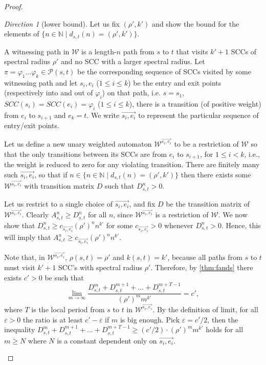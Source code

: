 \documentclass{lmcs}
\theoremstyle{plain}
\theoremstyle{definition}
\theoremstyle{remark}
\newtheorem{dir}{Direction}
\newcommand\period{T}
\newcommand{\SCC}{\ensuremath{\mathit{SCC}}}
\newcommand{\scc}{\varphi}
\newcommand\wa{\mathcal{W}}
\begin{document}
\begin{proof}
\hfill

\begin{dir}[{lower bound}]
Let us fix $(\rho',k')$ and show the bound for the elements of $\{n\in\mathbb{N} \mid d_{s,t}(n)= (\rho',k')\}$.

A witnessing path in $\wa$ is a length-$n$ path from $s$ to $t$ that visits $k'+1$ SCCs of spectral radius $\rho'$ and no SCC with a  larger spectral radius.
Let $\pi = \scc_1\dots\scc_k \in \mathscr{P}(s,t)$  be the corresponding sequence of SCCs visited by some witnessing path and let $s_i, e_i$ ($1\le i\le k$) be the entry and exit points (respectively into and out of $\scc_i$) on that path,
i.e.  $s=s_1$, $\SCC(s_i) = \SCC(e_i) = \scc_i$ ($1 \le i \le k$), there is a transition (of positive weight) from $e_i$ to $s_{i+1}$ and $e_k=t$. We write $\vec{s_i,e_i}$ to represent the particular sequence of entry/exit points.

Let us define  a new unary weighted automaton  $\wa^{\vec{s_i,e_i}}$ to be a restriction of $\wa$ so that
the only transitions between its SCCs are from $e_i$ to $s_{i+1}$, for $1 \le i < k$,
i.e., the weight is reduced to zero for any violating transition.  There are finitely many such $\vec{s_i,e_i}$, so that if $n \in \{n\in\mathbb{N} \mid d_{s,t}(n)= (\rho',k')\}$ then there exists some $\wa^{\vec{s_i,e_i}}$ with transition matrix $D$ such that $D_{s,t}^n > 0$.

Let us restrict to a single choice of $\vec{s_i,e_i}$, and fix $D$ be the transition matrix of $\wa^{\vec{s_i,e_i}}$. Clearly $A_{s,t}^n \ge D_{s,t}^n$ for all $n$, since $\wa^{\vec{s_i,e_i}}$ is a restriction of $\wa$. We now show that $D_{s,t}^n \ge c_{\vec{s_i,e_i}}(\rho')^n n^{k'}$ for some $c_{\vec{s_i,e_i}} > 0$ whenever $D_{s,t}^{n}>0$. Hence, this will imply that $A_{s,t}^n\ge c_{\vec{s_i,e_i}}(\rho')^n n^{k'}$.

Note that, in $\wa^{\vec{s_i,e_i}}$, $\rho(s,t)=\rho'$ and $k(s,t)=k'$,
because  all paths from $s$ to $t$ must visit $k'+1$ SCC's with spectral radius $\rho'$. Therefore, by \cref{thm:fands} there exists $c'>0$ be such that
\[\lim_{m\to\infty} \frac{D_{s,t}^m + D_{s,t}^{m+1} + \dots + D_{s,t}^{m+T-1}}{(\rho')^m m^{k'}} = c', \]
where $\period$ is the local period from $s$ to $t$ in $\wa^{\vec{s_i,e_i}}$. By the definition of limit,
for all $\varepsilon > 0$ the ratio is at least $c' - \varepsilon$
if $m$ is big enough.
Pick $\varepsilon = c'/2$, then the inequality
$D_{s,t}^m + D_{s,t}^{m+1} + \dots + D_{s,t}^{m+T-1} \ge (c'/2) \cdot (\rho')^m m^{k'}$
holds for all $m \ge N$ where $N$ is a constant dependent
only on $\vec{s_i,e_i}$.


\end{dir}
\end{proof}
\end{document}

